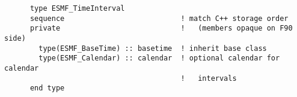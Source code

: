 \begin{verbatim}
      type ESMF_TimeInterval
      sequence                           ! match C++ storage order
      private                            !   (members opaque on F90 side)
        type(ESMF_BaseTime) :: basetime  ! inherit base class
        type(ESMF_Calendar) :: calendar  ! optional calendar for calendar
                                         !   intervals
      end type
\end{verbatim}
